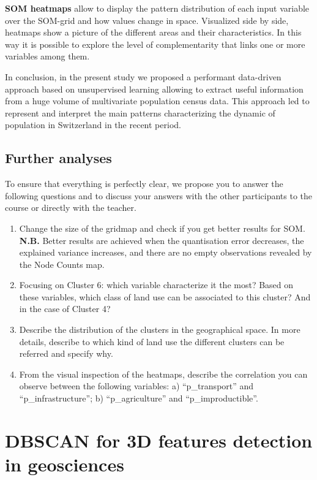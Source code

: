 \documentclass[
]{article}
\begin{document}
\textbf{SOM heatmaps} allow to display the pattern distribution of each input variable over the SOM-grid and how values change in space.
Visualized side by side, heatmaps show a picture of the different areas and their characteristics.
In this way it is possible to explore the level of complementarity that links one or more variables among them.

In conclusion, in the present study we proposed a performant data-driven approach based on unsupervised learning allowing to extract useful information from a huge volume of multivariate population census data.
This approach led to represent and interpret the main patterns characterizing the dynamic of population in Switzerland in the recent period.

\subsection{Further analyses}\label{further-analyses}

To ensure that everything is perfectly clear, we propose you to answer the following questions and to discuss your answers with the other participants to the course or directly with the teacher.

\begin{enumerate}
\def\labelenumi{\arabic{enumi}.}
\item
  Change the size of the gridmap and check if you get better results for SOM.
  \textbf{N.B.} Better results are achieved when the quantisation error decreases, the explained variance increases, and there are no empty observations revealed by the Node Counts map.
\item
  Focusing on Cluster 6: which variable characterize it the most?
  Based on these variables, which class of land use can be associated to this cluster?
  And in the case of Cluster 4?
\item
  Describe the distribution of the clusters in the geographical space.
  In more details, describe to which kind of land use the different clusters can be referred and specify why.
\item
  From the visual inspection of the heatmaps, describe the correlation you can observe between the following variables: a) ``p\_transport'' and ``p\_infrastructure''; b) ``p\_agriculture'' and ``p\_improductible''.
\end{enumerate}

\section{DBSCAN for 3D features detection in geosciences}\label{dbscan}
\end{document}
